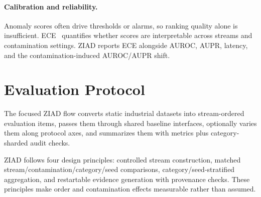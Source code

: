 \documentclass[runningheads]{llncs}
\begin{document}
\paragraph{Calibration and reliability.}
Anomaly scores often drive thresholds or alarms, so ranking quality alone is
insufficient. ECE~\cite{Guo2017Calibration} quantifies whether scores are
interpretable across streams and contamination settings. ZIAD reports ECE
alongside AUROC, AUPR, latency, and the contamination-induced AUROC/AUPR shift.

\section{Evaluation Protocol}
The focused ZIAD flow converts static industrial datasets into stream-ordered
evaluation items, passes them through shared baseline interfaces, optionally
varies them along protocol axes, and summarizes them with metrics plus
category-sharded audit checks.

ZIAD follows four design principles: controlled stream construction, matched
stream/contamination/category/seed comparisons, category/seed-stratified
aggregation, and restartable evidence generation with provenance checks. These
principles make order and contamination effects measurable rather than assumed.
\end{document}
